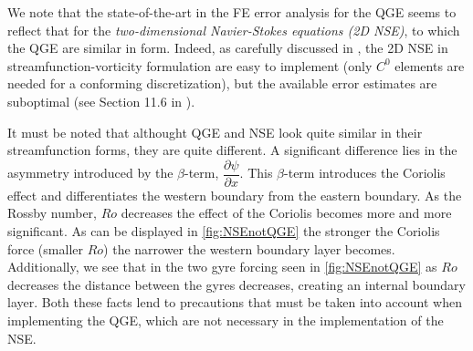 We note that the state-of-the-art in the FE error analysis for the QGE seems to
reflect that for the \emph{two-dimensional Navier-Stokes equations (2D NSE)}, to
which the QGE are similar in form.  Indeed, as carefully discussed in
\cite{Gunzburger89}, the 2D NSE in streamfunction-vorticity formulation are easy
to implement (only $C^0$ elements are needed for a conforming discretization),
but the available error estimates are suboptimal (see Section 11.6 in
\cite{Gunzburger89}).
\begin{remark}
  It must be noted that althought QGE and NSE look quite similar in their
  streamfunction forms, they are quite different. A significant difference lies
  in the asymmetry introduced by the $\beta$-term, $\dfrac{\partial
  \psi}{\partial x}$. This $\beta$-term introduces the Coriolis effect and
  differentiates the western boundary from the eastern boundary.  As the Rossby
  number, $Ro$ decreases the effect of the Coriolis becomes more and more
  significant. As can be displayed in \autoref{fig:NSEnotQGE} the stronger the
  Coriolis force (smaller $Ro$) the narrower the western boundary layer becomes.
  Additionally, we see that in the two gyre forcing seen in
  \autoref{fig:NSEnotQGE} as $Ro$ decreases the distance between the gyres
  decreases, creating an internal boundary layer. Both these facts lend to
  precautions that must be taken into account when implementing the QGE, which
  are not necessary in the implementation of the NSE.
\end{remark}

